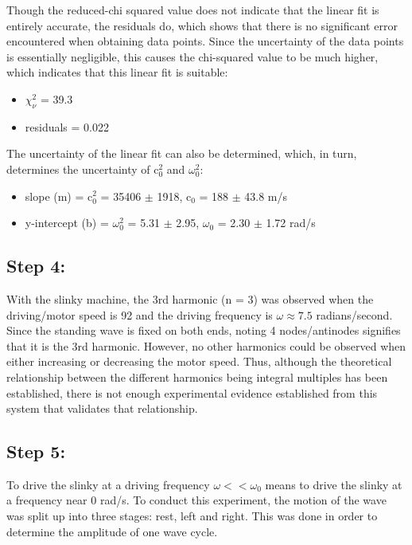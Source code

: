 \documentclass[12pt, letterpaper, twoside]{article}
\begin{document}
Though the reduced-chi squared value does not indicate that the linear fit is entirely accurate, the residuals do, which shows that there is no significant error encountered when obtaining data points. Since the uncertainty of the data points is essentially negligible, this causes the chi-squared value to be much higher, which indicates that this linear fit is suitable:

\begin{itemize}
    \item $\chi_{\nu}^2$ = 39.3
    \item residuals = 0.022
\end{itemize}

The uncertainty of the linear fit can also be determined, which, in turn, determines the uncertainty of c$_0^2$ and $\omega_0^2$:

\begin{itemize}
    \item slope (m) = c$_0^2$ = 35406 $\pm$ 1918, c$_0$ = 188 $\pm$ 43.8 m/s
    \item y-intercept (b) = $\omega_0^2$ = 5.31 $\pm$ 2.95, $\omega_0$ = 2.30 $\pm$ 1.72 rad/s
\end{itemize}

\subsection{Step 4:}

With the slinky machine, the 3rd harmonic  (n = 3) was observed when the driving/motor speed is 92 and the driving frequency is $\omega \approx 7.5$ radians/second. Since the standing wave is fixed on both ends, noting 4 nodes/antinodes signifies that it is the 3rd harmonic. However, no other harmonics could be observed when either increasing or decreasing the motor speed. Thus, although the theoretical relationship between the different harmonics being integral multiples has been established, there is not enough experimental evidence established from this system that validates that relationship.

\subsection{Step 5:}

To drive the slinky at a driving frequency $\omega << \omega_0$ means to drive the slinky at a frequency near 0 rad/s. To conduct this experiment, the motion of the wave was split up into three stages: rest, left and right. This was done in order to determine the amplitude of one wave cycle.
\end{document}
